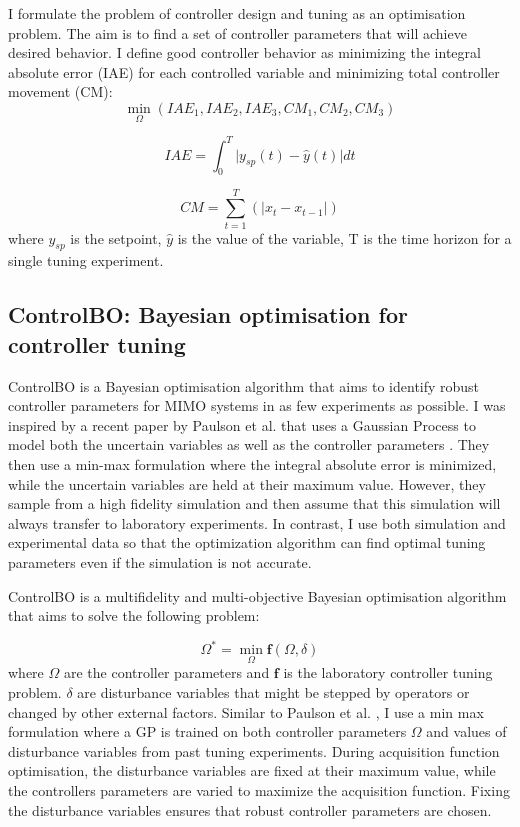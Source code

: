 I formulate the problem of controller design and tuning as an optimisation problem. The aim is to find a set of controller parameters that will achieve desired behavior. I define good controller behavior as minimizing the integral absolute error (IAE) for each controlled variable and minimizing total controller movement (CM):
\begin{equation}
    \min_{\Omega}(IAE_1, IAE_2, IAE_3, CM_1, CM_2, CM_3)
\end{equation}


\begin{equation}
    IAE = \int_0^T \vert y_{sp}(t) - \hat y(t) \vert dt
\end{equation}

\begin{equation}
    CM = \sum_{t=1}^{T}( \vert x_t - x_{t-1} \vert)
\end{equation}
where $y_{sp}$ is the setpoint,  $\hat y$  is the value of  the variable, T is the time horizon for a single tuning experiment. 

\subsection{ControlBO: Bayesian optimisation for controller tuning}

ControlBO is a Bayesian optimisation algorithm that aims to identify robust controller parameters for MIMO systems in as few experiments as possible. I was inspired by a recent paper by Paulson et al. that uses a Gaussian Process to model both the uncertain variables as well as the controller parameters \cite{Paulson2022}. They then use a min-max formulation where the integral absolute error is minimized, while the uncertain variables are held at their maximum value. However, they sample from a high fidelity simulation and then assume that this simulation will always transfer to laboratory experiments. In contrast, I use both simulation and experimental data so that the optimization algorithm can find optimal tuning parameters even if the simulation is not accurate.

ControlBO is a multifidelity and multi-objective Bayesian optimisation algorithm that aims to solve the following problem:

\begin{equation}
    \Omega^* = \min_{\Omega} \mathbf f(\Omega, \delta)
\end{equation}
where $\Omega$ are the controller parameters and $\mathbf f$ is the laboratory controller tuning problem. $\delta$ are disturbance variables that might be stepped by operators or changed by other external factors. Similar to Paulson et al. \cite{Paulson2022}, I use a min max formulation where a GP is trained on both controller parameters $\Omega$ and values of disturbance variables from past tuning experiments. During acquisition function optimisation, the disturbance variables are fixed at their maximum value, while the controllers parameters are varied to maximize the acquisition function. Fixing the disturbance variables ensures that robust controller parameters are chosen.

